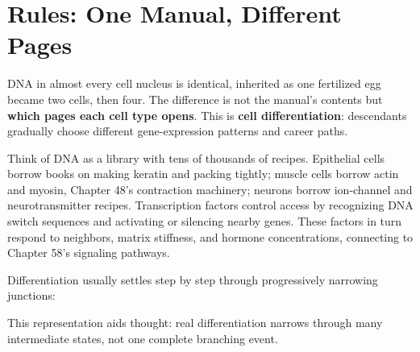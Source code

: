 \section{Rules: One Manual, Different Pages}

DNA in almost every cell nucleus is identical, inherited as one fertilized egg became two cells, then four. The difference is not the manual's contents but \textbf{which pages each cell type opens}. This is \textbf{cell differentiation}: descendants gradually choose different gene-expression patterns and career paths.

Think of DNA as a library with tens of thousands of recipes. Epithelial cells borrow books on making keratin and packing tightly; muscle cells borrow actin and myosin, Chapter 48's contraction machinery; neurons borrow ion-channel and neurotransmitter recipes. Transcription factors control access by recognizing DNA switch sequences and activating or silencing nearby genes. These factors in turn respond to neighbors, matrix stiffness, and hormone concentrations, connecting to Chapter 58's signaling pathways.

Differentiation usually settles step by step through progressively narrowing junctions:

\begin{center}
\end{center}

This representation aids thought: real differentiation narrows through many intermediate states, not one complete branching event.

